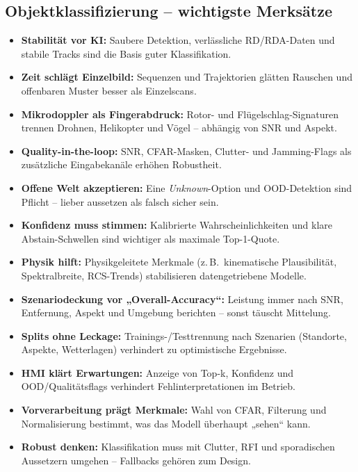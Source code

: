\subsection{Objektklassifizierung – wichtigste Merksätze}
\begin{itemize}
  \item \textbf{Stabilität vor KI:} Saubere Detektion, verlässliche RD/RDA-Daten und stabile Tracks sind die Basis guter Klassifikation.
  \item \textbf{Zeit schlägt Einzelbild:} Sequenzen und Trajektorien glätten Rauschen und offenbaren Muster besser als Einzelscans.
  \item \textbf{Mikrodoppler als Fingerabdruck:} Rotor- und Flügelschlag-Signaturen trennen Drohnen, Helikopter und Vögel – abhängig von SNR und Aspekt.
  \item \textbf{Quality-in-the-loop:} SNR, CFAR-Masken, Clutter- und Jamming-Flags als zusätzliche Eingabekanäle erhöhen Robustheit.
  \item \textbf{Offene Welt akzeptieren:} Eine \emph{Unknown}-Option und OOD-Detektion sind Pflicht – lieber aussetzen als falsch sicher sein.
  \item \textbf{Konfidenz muss stimmen:} Kalibrierte Wahrscheinlichkeiten und klare Abstain-Schwellen sind wichtiger als maximale Top-1-Quote.
  \item \textbf{Physik hilft:} Physikgeleitete Merkmale (z.\,B.\ kinematische Plausibilität, Spektralbreite, RCS-Trends) stabilisieren datengetriebene Modelle.
  \item \textbf{Szenariodeckung vor „Overall-Accuracy“:} Leistung immer nach SNR, Entfernung, Aspekt und Umgebung berichten – sonst täuscht Mittelung.
  \item \textbf{Splits ohne Leckage:} Trainings-/Testtrennung nach Szenarien (Standorte, Aspekte, Wetterlagen) verhindert zu optimistische Ergebnisse.
  \item \textbf{HMI klärt Erwartungen:} Anzeige von Top-k, Konfidenz und OOD/Qualitätsflags verhindert Fehlinterpretationen im Betrieb.
  \item \textbf{Vorverarbeitung prägt Merkmale:} Wahl von CFAR, Filterung und Normalisierung bestimmt, was das Modell überhaupt „sehen“ kann.
  \item \textbf{Robust denken:} Klassifikation muss mit Clutter, RFI und sporadischen Aussetzern umgehen – Fallbacks gehören zum Design.
\end{itemize}








